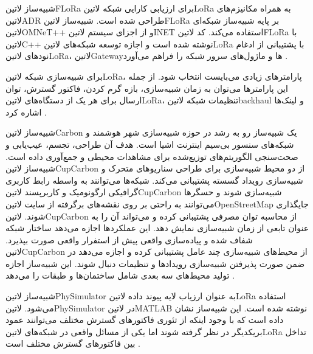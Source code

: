 
شبیه‌ساز ‌لاتین{FLoRa} برای ارزیابی کارایی شبکه ‌لاتین{LoRa} به همراه مکانیزم‌های ‌لاتین{ADR} طراحی شده است.
شبیه‌ساز ‌لاتین{FLoRa} بر پایه شبیه‌ساز شبکه‌ای ‌لاتین{OMNeT++} و از اجزای سیستم ‌لاتین{INET} استفاده می‌کند.
کد ‌لاتین{FLoRa} با ‌لاتین{C++} نوشته شده است و اجازه توسعه شبکه‌های ‌لاتین{LoRa} با پشتیبانی از ادغام
نودهای ‌لاتین{LoRa}، ‌لاتین{Gateway}ها و ماژول‌های سرور شبکه را فراهم می‌آورد
.

برای شبیه‌سازی شبکه ‌لاتین{LoRa}، پارامترهای زیادی می‌بایست انتخاب شود.
از جمله این پارامترها می‌توان به زمان شبیه‌سازی، بازه گرم کردن، فاکتور گسترش، توان ارسال برای هر یک از دستگاه‌های ‌لاتین{LoRa}،
تنظیمات شبکه ‌لاتین{backhaul} و لینک‌ها اشاره کرد
.


شبیه‌ساز ‌لاتین{Carbon} یک شبیه‌ساز رو به رشد در حوزه شبیه‌سازی شهر هوشمند و شبکه‌های سنسور بی‌سیم اینترنت اشیا است.
هدف آن طراحی، تجسم، عیب‌یابی و صحت‌سنجی الگوریتم‌های توزیع‌شده برای مشاهدات محیطی و جمع‌آوری داده است.
شبیه‌ساز ‌لاتین{CupCarbon} از دو محیط شبیه‌سازی برای طراحی سناریوهای متحرک و شبیه‌سازی رویداد گسسته پشتیبانی می‌کند.
شبکه‌ها می‌توانند به واسطه رابط کاربری گرافیکی ارگونومیک و کاربرپسند ‌لاتین{CupCarbon} شبیه‌سازی شوند و حسگرها می‌توانند
به راحتی بر روی نقشه‌های برگرفته از سایت ‌لاتین{OpenStreetMap} جایگذاری شوند.
‌لاتین{CupCarbon} از محاسبه توان مصرفی پشتیبانی کرده و می‌تواند آن را به عنوان تابعی از زمان شبیه‌سازی نمایش دهد.
این عملکردها اجازه می‌دهد ساختار شبکه شفاف شده و پیاده‌سازی واقعی پیش از استفرار واقعی صورت بپذیرد.
‌لاتین{CupCarbon} از محیط‌های شبیه‌سازی چند عامل پشتیبانی کرده و اجازه می‌دهد در ضمن صورت پذیرفتن شبیه‌سازی رویدادها و
تنظیمات دنبال شوند.
این شبیه‌ساز اجازه تولید محیط‌های سه بعدی شامل ساختمان‌ها و طبقات را می‌دهد
.


شبیه‌ساز ‌لاتین{PhySimulator} به عنوان ارزیاب لایه پیوند داده ‌لاتین{LoRa} استفاده می‌شود.
‌لاتین{PhySimulator} در ‌لاتین{MATLAB} نوشته شده است.
این شبیه‌ساز نشان داده است که با وجود اینکه از تئوری فاکتورهای گسترش مختلف می‌توانند عمود بریکدیگر در نظر گرفته شوند
اما یکی از مسائل واقعی در شبکه‌های ‌لاتین{LoRa} تداخل بین فاکتورهای گسترش مختلف است
.


